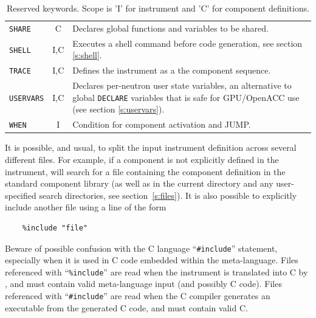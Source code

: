 \begin{table}
\begin{center}
{\begin{tabular}{|l|c|p{}|}
      \texttt{SHARE} & C & Declares global functions and variables to be shared. \\
      \texttt{SHELL} & I,C & Executes a shell command before code generation, see section \ref{s:shell}. \\
      \texttt{TRACE} & I,C & Defines the instrument as a the component sequence. \\
      \texttt{USERVARS} & I,C & Declares per-neutron user state variables, an alternative to global \texttt{DECLARE} variables that is safe for GPU/OpenACC use (see section \ref{s:uservars}). \\
      \texttt{WHEN}  & I & Condition for component activation and JUMP.\\
      \hline
    \end{tabular}
    \caption{Reserved \MCS keywords.
    Scope is 'I' for instrument and 'C' for component definitions.
    }
    \label{t:keywords}
    }
  \end{center}
\end{table}

It is possible, and usual, to split the input instrument definition
across several different files. For example, if a component is not
explicitly defined in the instrument,
\mcs will search for a file containing the component definition in the
standard component library (as well as in the current directory and any
user-specified search directories, see section~\ref{s:files}). It is
also possible to explicitly include another file using a line of the
form 
\begin{lstlisting}
    %include "file"
\end{lstlisting}
Beware of possible confusion with the C language ``\verb+#include+''
statement, especially when it is used in C code embedded within the
\MCS meta-language. Files referenced with ``\verb+%include+'' are read
when the instrument is translated into C by \mcs, and must
contain valid \MCS meta-language input (and possibly C code). Files referenced with
``\verb+#include+'' are read when the C compiler generates an
executable from the generated C code, and must contain valid C.

